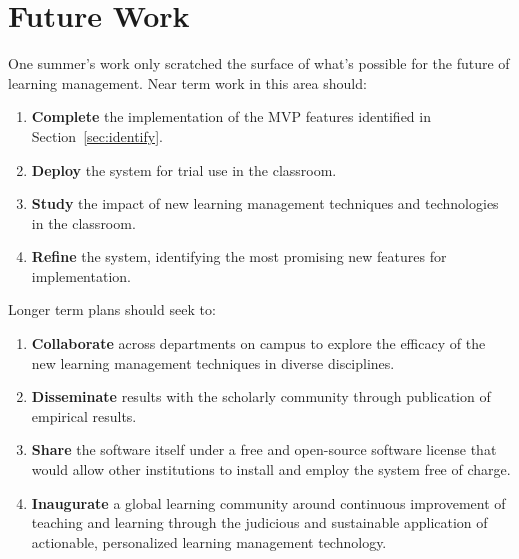 \documentclass{article}
\begin{document}
\section{Future Work}

One summer's work only scratched the surface of what's
possible for the future of learning management.
Near term work in this area should:
\begin{enumerate}
\item \textbf{Complete} the implementation of the MVP features
  identified in Section~\ref{sec:identify}.
\item \textbf{Deploy} the system for trial use in the classroom.
\item \textbf{Study} the impact of new learning management
  techniques and technologies in the classroom.
\item \textbf{Refine} the system,
  identifying the most promising new features
  for implementation.
\end{enumerate}
Longer term plans should seek to:
\begin{enumerate}
\item \textbf{Collaborate}
  across departments on campus
  to explore the efficacy of the new learning management techniques
  in diverse disciplines.
\item \textbf{Disseminate} results
  with the scholarly community
  through publication of empirical results.
\item \textbf{Share} the software itself
  under a free and open-source software license that would
  allow other institutions to install and employ the
  system free of charge.
\item \textbf{Inaugurate}
  a global learning community around
  continuous improvement of
  teaching and learning
  through the judicious and sustainable application
  of actionable, personalized learning management technology.
\end{enumerate}
\end{document}

